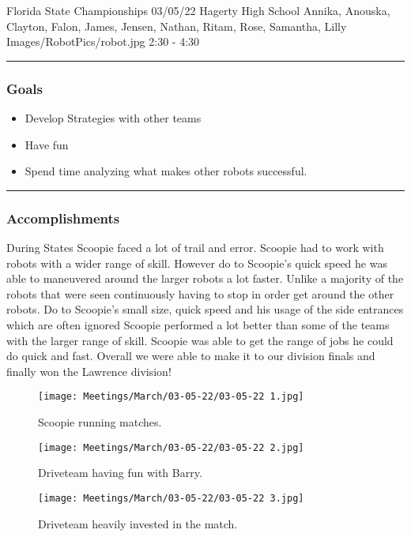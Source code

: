 \insertmeeting 
	{Florida State Championships} 
	{03/05/22} 
	{Hagerty High School}
	{Annika, Anouska, Clayton, Falon, James, Jensen, Nathan, Ritam, Rose, Samantha, Lilly}
	{Images/RobotPics/robot.jpg}
	{2:30 - 4:30}
	
\noindent\hfil\rule{\textwidth}{.4pt}\hfil
\subsubsection*{Goals}
\begin{itemize}
    \item Develop Strategies with other teams
	\item Have fun
	\item Spend time analyzing what makes other robots successful.

\end{itemize} 

\noindent\hfil\rule{\textwidth}{.4pt}\hfil

\subsubsection*{Accomplishments}
During States Scoopie faced a lot of trail and error. Scoopie had to work with robots with a wider range of skill. However do to Scoopie's quick speed he was able to maneuvered around the larger robots a lot faster. Unlike a majority of the robots that were seen continuously having to stop in order get around the other robots. Do to Scoopie's small size, quick speed and his usage of the side entrances which are often ignored Scoopie performed a lot better than some of the teams with the larger range 
of skill. Scoopie was able to get the range of jobs he could do quick and fast. Overall we were able to make it to our division finals and finally won the Lawrence division! 

\begin{figure}[htp]
\centering
\texttt{[image: Meetings/March/03-05-22/03-05-22 1.jpg]}
\caption{Scoopie running matches.}
\label{fig:030522_1}
\end{figure}

\begin{figure}[htp]
\centering
\texttt{[image: Meetings/March/03-05-22/03-05-22 2.jpg]}
\caption{Driveteam having fun with Barry.}
\label{fig:030522_2}
\end{figure}

\begin{figure}[htp]
\centering
\texttt{[image: Meetings/March/03-05-22/03-05-22 3.jpg]}
\caption{Driveteam heavily invested in the match.}
\label{fig:030522_3}
\end{figure}



